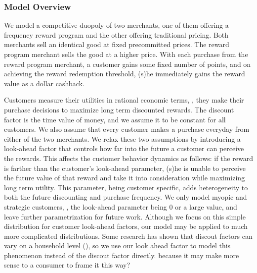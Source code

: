 \subsubsection{Model Overview}
We model a competitive duopoly of two merchants, one of them offering a frequency reward program and the other offering traditional pricing.
Both merchants sell an identical good at fixed precommitted prices.
The reward program merchant sells the good at a higher price.
With each purchase from the reward program merchant, a customer gains some fixed number of points, and on achieving the reward redemption threshold, (s)he immediately gains the reward value as a dollar cashback.

Customers measure their utilities in rational economic terms, \ie, they make their purchase decisions to maximize long term discounted rewards.
The discount factor is the time value of money, and we assume it to be constant for all customers.
We also assume that every customer makes a purchase everyday from either of the two merchants.
We relax these two assumptions by introducing a look-ahead factor that controls how far into the future a customer can perceive the rewards. 
This affects the customer behavior dynamics as follows: if the reward is farther than the customer's look-ahead parameter, (s)he is unable to perceive the future value of that reward and take it into consideration while maximizing long term utility.
This parameter, being customer specific, adds heterogeneity to both the future discounting and purchase frequency.
We only model myopic and strategic customers, \ie, the look-ahead parameter being $0$ or a large value, and leave further parametrization for future work.
Although we focus on this simple distribution for customer look-ahead factors, our model may be applied to much more complicated distributions. Some research has shown that discout factors can vary on a household level (\cite{}), so we use our look ahead factor to model this phenomenon instead of the discout factor directly. {\nolan because it may make more sense to a consumer to frame it this way?}

